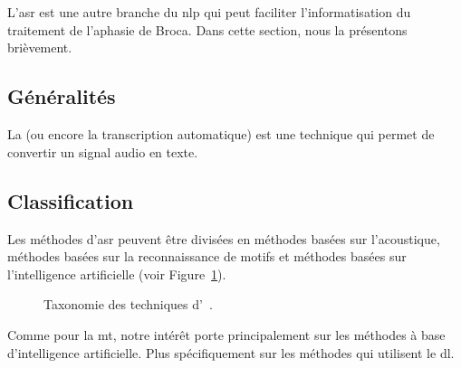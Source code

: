 \section{}

L'\gls{asr} est une autre branche du \gls{nlp} 
qui peut faciliter l'informatisation du traitement de l'aphasie de Broca.
Dans cette section, nous la présentons brièvement.


\subsection{Généralités}

La  (ou encore la transcription automatique) 
est une technique qui permet de convertir un signal audio en texte.


\subsection{Classification}

Les méthodes d'\gls{asr} peuvent être divisées en méthodes basées sur l'acoustique,
méthodes basées sur la reconnaissance de motifs
et méthodes basées sur l'intelligence artificielle (voir Figure~\ref{fig.asr-taxonomy-tree}).

\begin{figure}
    \centering
    \resizebox{\textwidth}{!}{}
    \caption[Taxonomie des techniques d'.]
    {Taxonomie des techniques d'~\cite{Volny_Novak_Zezula_2012}.}
    \label{fig.asr-taxonomy-tree}
\end{figure}

Comme pour la \gls{mt},
notre intérêt porte principalement sur les méthodes à base d'intelligence artificielle.
Plus spécifiquement sur les méthodes qui utilisent le \gls{dl}.